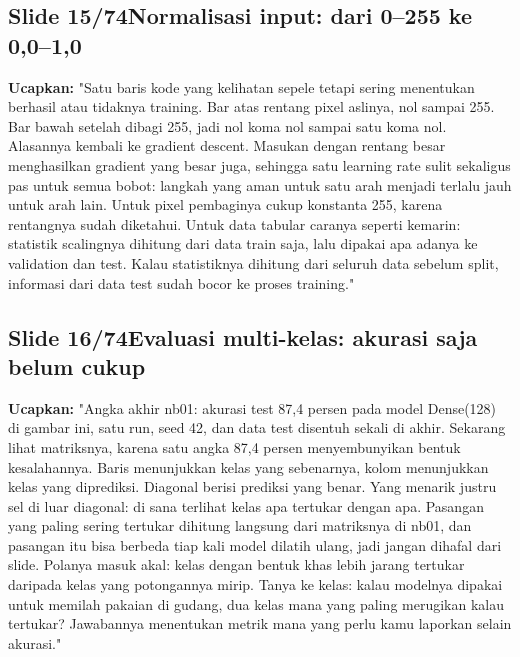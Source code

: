 \documentclass[11pt]{article}
\renewcommand{\framebox}[1]{\colorbox{acc!15}{\textcolor{acc}{\textbf{#1}}}}
\begin{document}
\subsection*{\framebox{Slide 15/74}\quad Normalisasi input: dari 0--255 ke 0,0--1,0}
\textbf{Ucapkan:} "Satu baris kode yang kelihatan sepele tetapi sering menentukan berhasil atau tidaknya training. Bar atas rentang pixel aslinya, nol sampai 255. Bar bawah setelah dibagi 255, jadi nol koma nol sampai satu koma nol. Alasannya kembali ke gradient descent. Masukan dengan rentang besar menghasilkan gradient yang besar juga, sehingga satu learning rate sulit sekaligus pas untuk semua bobot: langkah yang aman untuk satu arah menjadi terlalu jauh untuk arah lain. Untuk pixel pembaginya cukup konstanta 255, karena rentangnya sudah diketahui. Untuk data tabular caranya seperti kemarin: statistik scalingnya dihitung dari data train saja, lalu dipakai apa adanya ke validation dan test. Kalau statistiknya dihitung dari seluruh data sebelum split, informasi dari data test sudah bocor ke proses training."\\[2pt]

\subsection*{\framebox{Slide 16/74}\quad Evaluasi multi-kelas: akurasi saja belum cukup}
\textbf{Ucapkan:} "Angka akhir nb01: akurasi test 87,4 persen pada model Dense(128) di gambar ini, satu run, seed 42, dan data test disentuh sekali di akhir. Sekarang lihat matriksnya, karena satu angka 87,4 persen menyembunyikan bentuk kesalahannya. Baris menunjukkan kelas yang sebenarnya, kolom menunjukkan kelas yang diprediksi. Diagonal berisi prediksi yang benar. Yang menarik justru sel di luar diagonal: di sana terlihat kelas apa tertukar dengan apa. Pasangan yang paling sering tertukar dihitung langsung dari matriksnya di nb01, dan pasangan itu bisa berbeda tiap kali model dilatih ulang, jadi jangan dihafal dari slide. Polanya masuk akal: kelas dengan bentuk khas lebih jarang tertukar daripada kelas yang potongannya mirip. Tanya ke kelas: kalau modelnya dipakai untuk memilah pakaian di gudang, dua kelas mana yang paling merugikan kalau tertukar? Jawabannya menentukan metrik mana yang perlu kamu laporkan selain akurasi."\\[2pt]
\end{document}
